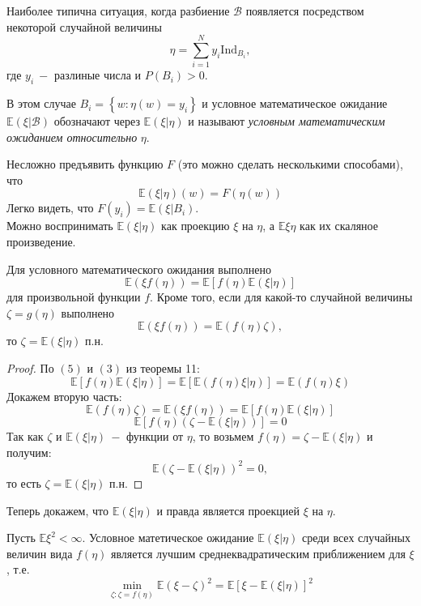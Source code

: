 Наиболее типична ситуация, когда разбиение $\mathcal{B}$ появляется посредством некоторой случайной величины
\[
    \eta = \sum_{i = 1}^{N} y_i \text{Ind}_{B_i},
\]
где $y_i \ - $ разлиные числа и $P\left(B_i\right) > 0$.
\begin{definition}
В этом случае $B_i = \left\{w : \eta\left(w\right) = y_i\right\}$ и условное математическое ожидание $\mathbb{E}\left(\xi | \mathcal{B}\right)$ обозначают через $\mathbb{E}\left(\xi| \eta\right)$ и называют \textit{условным математическим ожиданием относительно} $\eta$.

\end{definition}
Несложно предъявить функцию $F$ (это можно сделать несколькими способами), что 
\[
    \mathbb{E}\left(\xi | \eta\right)\left(w\right) = F\left(\eta\left(w\right)\right)
\]
Легко видеть, что $F\left(y_i\right) = \mathbb{E}\left(\xi | B_i\right)$.
\\
Можно воспринимать $\mathbb{E}\left(\xi | \eta\right)$ как проекцию $\xi$ на $\eta$, а $\mathbb{E} \xi \eta$ как их скаляное произведение.
\begin{lemma}
Для условного математического ожидания выполнено
\[
    \mathbb{E}\left(\xi f\left(\eta\right)\right) = \mathbb{E}\left[f\left(\eta\right)\mathbb{E}\left(\xi | \eta\right)\right]
\]
для произвольной функции $f$. Кроме того, если для какой-то случайной величины $\zeta = g\left(\eta\right)$ выполнено 
\[
    \mathbb{E}\left(\xi f\left(\eta\right)\right) = \mathbb{E}\left(f\left(\eta\right) \zeta\right),
\]
то $\zeta = \mathbb{E}\left(\xi | \eta\right)$ п.н.
\end{lemma}

\begin{proof}
По $(5)$ и $(3)$ из теоремы 11:
\[
    \mathbb{E}\left[f\left(\eta\right) \mathbb{E}\left(\xi | \eta\right)\right] =
    \mathbb{E} \left[\mathbb{E}\left(f\left(\eta\right) \xi | \eta\right)\right] = \mathbb{E}\left(f\left(\eta\right) \xi\right)
\]
Докажем вторую часть: 
\[
    \mathbb{E} \left(f\left(\eta\right) \zeta\right) = \mathbb{E}\left(\xi f\left(\eta\right)\right) = \mathbb{E}\left[f\left(\eta\right)\mathbb{E}\left(\xi | \eta\right)\right]
\]
\[
    \mathbb{E} \left[f\left(\eta\right) \left(\zeta - \mathbb{E}\left(\xi | \eta \right)\right)\right] = 0
\]
Так как $\zeta$ и $\mathbb{E}\left(\xi | \eta\right) \ -$ функции от $\eta$, то возьмем $f\left(\eta\right) = \zeta - \mathbb{E}\left(\xi | \eta \right)$ и получим:
\[
    \mathbb{E} \left(\zeta - \mathbb{E}\left(\xi | \eta \right)\right)^ 2 = 0,
\]
то есть $\zeta = \mathbb{E}\left(\xi | \eta\right)$ п.н.
\end{proof}
Теперь докажем, что $\mathbb{E}\left(\xi | \eta\right)$ и правда является проекцией $\xi$ на $\eta$.
\begin{advice}

Пусть $\mathbb{E} \xi ^ 2 < \infty$. Условное матетическое ожидание $\mathbb{E}\left(\xi | \eta\right)$ среди всех случайных величин вида $f\left(\eta\right)$ является лучшим среднеквадратическим приближением для $\xi$, т.е.
\[
    \min_{\zeta : \zeta = f\left(\eta\right)} \mathbb{E} \left(\xi - \zeta\right) ^ 2 = \mathbb{E} \left[\xi - \mathbb{E}\left(\xi | \eta\right)\right] ^ 2
\]
\end{advice}

